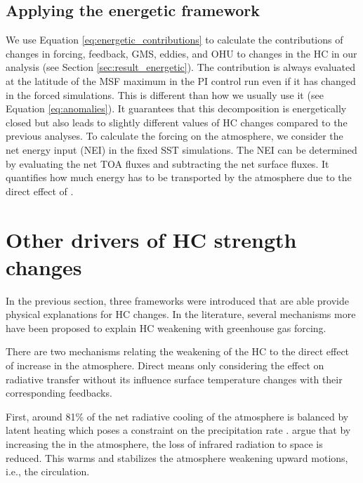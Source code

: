 \subsection{Applying the energetic framework}

We use Equation \ref{eq:energetic_contributions} to calculate the contributions of changes in forcing, feedback, GMS, eddies, and OHU to changes in the HC in our analysis (see Section \ref{sec:result_energetic}). The contribution is always evaluated at the latitude of the MSF maximum in the PI control run even if it has changed in the forced simulations. This is different than how we usually use it (see Equation \eqref{eq:anomalies}). It guarantees that this decomposition is energetically closed but also leads to slightly different values of HC changes compared to the previous analyses. To calculate the forcing on the atmosphere, we consider the net energy input (NEI) in the fixed SST simulations. The NEI can be determined by evaluating the net TOA fluxes and subtracting the net surface fluxes. It quantifies how much energy has to be transported by the atmosphere due to the direct effect of \CO. 


\section{Other drivers of HC strength changes}
In the previous section, three frameworks were introduced that are able provide physical explanations for HC changes. In the literature, several mechanisms more have been proposed to explain HC weakening with greenhouse gas forcing. 

There are two mechanisms relating the weakening of the HC to the direct effect of \CO{} increase in the atmosphere. Direct means only considering the \CO{} effect on radiative transfer without its influence surface temperature changes with their corresponding feedbacks.

First, around 81\% of the net radiative cooling of the atmosphere is balanced by latent heating which poses a constraint on the precipitation rate \parencite{GlobalPhysicalClimatology2016}. \textcite{bonyRobustDirectEffect2013} argue that by increasing the \CO{} in the atmosphere, the loss of infrared radiation to space is reduced. This warms and stabilizes the atmosphere weakening upward motions, i.e., the circulation. 

